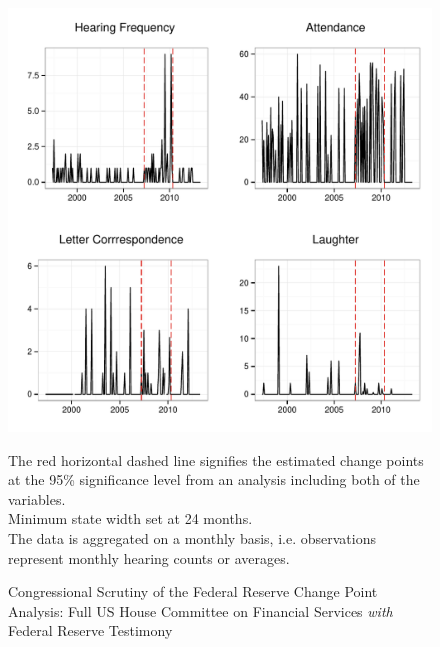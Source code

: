 \documentclass[a4paper]{article}\usepackage[]{graphicx}\usepackage[]{color}
\newenvironment{knitrout}{}{} %
\begin{document}
\begin{figure}
    \caption{Congressional Scrutiny of the Federal Reserve Change Point Analysis: Full US House Committee on Financial Services \emph{with} Federal Reserve Testimony}
    \label{fig:HouseFedCP}
\begin{knitrout}
\color{fgcolor}

{\centering \includegraphics[width=0.95\linewidth]{figure/ScrutinyHouseFedCP} 

}



\end{knitrout}
{\scriptsize{The red horizontal dashed line signifies the estimated change points at the 95\% significance level from an analysis including both of the variables.\\
Minimum state width set at 24 months. \\
The data is aggregated on a monthly basis, i.e. observations represent monthly hearing counts or averages.}}
\end{figure}
\end{document}
